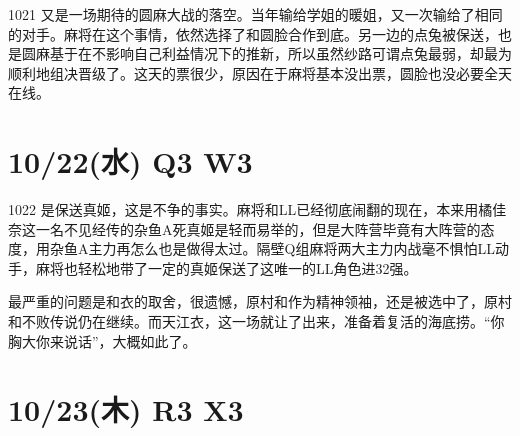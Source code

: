 1021 又是一场期待的圆麻大战的落空。当年输给学姐的暖姐，又一次输给了相同的对手。麻将在这个事情，依然选择了和圆脸合作到底。另一边的点兔被保送，也是圆麻基于在不影响自己利益情况下的推新，所以虽然纱路可谓点兔最弱，却最为顺利地组决晋级了。这天的票很少，原因在于麻将基本没出票，圆脸也没必要全天在线。

\section{10/22(水) Q3 W3}


1022 是保送真姬，这是不争的事实。麻将和LL已经彻底闹翻的现在，本来用橘佳奈这一名不见经传的杂鱼A死真姬是轻而易举的，但是大阵营毕竟有大阵营的态度，用杂鱼A主力再怎么也是做得太过。隔壁Q组麻将两大主力内战毫不惧怕LL动手，麻将也轻松地带了一定的真姬保送了这唯一的LL角色进32强。

最严重的问题是和衣的取舍，很遗憾，原村和作为精神领袖，还是被选中了，原村和不败传说仍在继续。而天江衣，这一场就让了出来，准备着复活的海底捞。“你胸大你来说话”，大概如此了。

\section{10/23(木) R3 X3}


